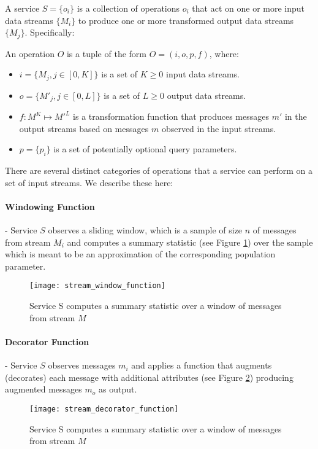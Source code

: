 A service $S = \{o_i\}$ is a collection of operations $o_i$ that act on one or more input data streams $\{M_i\}$ to produce one or more transformed output data streams $\{M_j\}$. Specifically:

An operation $O$ is a tuple of the form  $O = (i,o,p,f)$, where:
\begin{itemize} 
    \item $i = \{M_j, j \in [0, K]\}$ is a set of $K \ge 0$ input data streams.
    \item $o = \{M'_j, j \in [0, L]\}$ is a set of $L \ge 0$ output data streams.
    \item $f:M^K \mapsto M'^L$ is a transformation function that produces messages $m'$ in the output streams based on messages $m$ observed in the input streams.
    \item $p = \{p_i\}$ is a set of potentially optional query parameters.  
\end{itemize}

There are several distinct categories of operations that a service can perform on a set of input streams. We describe these here:

\paragraph{Windowing Function} - Service $S$ observes a sliding window, which is a sample of size $n$ of messages from stream $M_i$ and computes a summary statistic (see Figure \ref{fig:stream_window_function}) over the sample which is meant to be an approximation of the corresponding population parameter.

\begin{figure}[H]
\texttt{[image: stream\_window\_function]}
\centering
\caption {Service S computes a summary statistic over a window of messages from stream $M$}
\label{fig:stream_window_function}
\end{figure}
 
\paragraph{Decorator Function} - Service $S$ observes messages $m_i$ and applies a function that augments (decorates) each message with additional attributes (see Figure \ref{fig:stream_decorator_function}) producing augmented messages $m_o$ as output.

\begin{figure}[H]
\texttt{[image: stream\_decorator\_function]}
\centering
\caption {Service S computes a summary statistic over a window of messages from stream $M$}
\label{fig:stream_decorator_function}
\end{figure}

